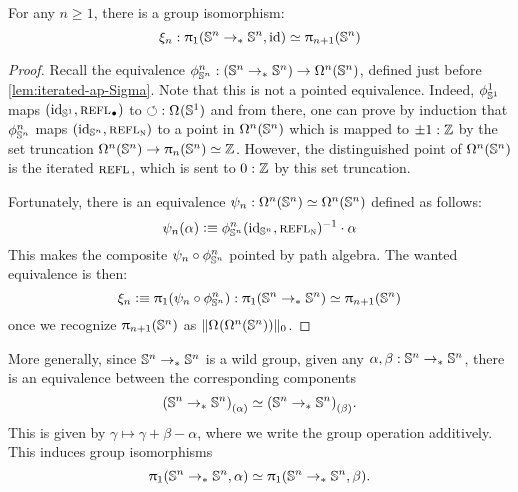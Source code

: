 \documentclass[english,a4paper]{lmcs}
\begin{document}
\begin{lem}
  For any $n\geq 1$, there is a group isomorphism:
  \begin{displaymath}
    \xi_n: \uppi_{1}({\mathbb S^{n}} \to_\ast {\mathbb S^{n}}, \mathord{\mathrm{id}}) \simeq \uppi_{n+1} ({\mathbb S^{n}})
  \end{displaymath}
  \label{lem:fgr-ptd-endomaps-Sn}
\end{lem}
\begin{proof}
  Recall the equivalence $\phi_{{\mathbb S^{n}}}^n : ({\mathbb S^{n}} \to_\ast {\mathbb S^{n}}) \to \mathop{\Omega^{n}} ({\mathbb S^{n}})$, defined just before \cref{lem:iterated-ap-Sigma}. Note that
  this is not a pointed equivalence. Indeed, $\phi_{{{\mathbb S^{1}}}}^1$ maps $(\id_\Sc,
  \refl\base)$ to $\Sloop: \loopspace\null(\Sc)$ and from there, one can prove by
  induction that $\phi_{{\mathbb S^{n}}}^n$ maps $(\mathord{\mathrm{id}}_{{\mathbb S^{n}}}, \mathop{{\textsc{refl}}_{\textsc{n}}})$ to a point in
  $\mathop{\Omega^{n}} ({\mathbb S^{n}})$ which is mapped to $\pm 1:\mathbb{Z}$ by the set truncation
  $\mathop{\Omega^{n}} ({\mathbb S^{n}}) \to \uppi_{n} ({\mathbb S^{n}}) \simeq \mathbb{Z}$. However, the distinguished
  point of $\mathop{\Omega^{n}} ({\mathbb S^{n}})$ is the iterated $\mathop{{\textsc{refl}}_{}}$, which is sent to
  $0:\mathbb{Z}$ by this set truncation.

  Fortunately, there is an equivalence $\psi_n:\mathop{\Omega^{n}} ({\mathbb S^{n}}) \simeq
  \mathop{\Omega^{n}}({\mathbb S^{n}})$ defined as follows:
  \begin{equation}
    \psi_n (\alpha) \vcentcolon\equiv \phi_{{\mathbb S^{n}}}^n(\mathord{\mathrm{id}}_{{\mathbb S^{n}}},\mathop{{\textsc{refl}}_{\textsc{n}}})^{-1}\cdot \alpha
    \label{eq:self-eq-to-refl}
  \end{equation}
  This makes the composite $\psi_n \circ \phi_{{\mathbb S^{n}}}^n$ pointed by path algebra.
  The wanted equivalence is then:
  \begin{equation}
    \xi_n\vcentcolon\equiv \uppi_{1}(\psi_n \circ \phi_{{\mathbb S^{n}}}^n) :
    \uppi_{1}({\mathbb S^{n}} \to_\ast {\mathbb S^{n}}) \simeq \uppi_{n+1} ({\mathbb S^{n}})
    \label{eq:fgr-ptd-endomaps-Sn-defn}
  \end{equation}
  once we recognize $\uppi_{n+1}({\mathbb S^{n}})$ as $\lVert\mathop{\Omega^{}}(\mathop{\Omega^{n}} ({\mathbb S^{n}}))\rVert_0$.
\end{proof}

\begin{rem}
  More generally, since ${\mathbb S^{n}} \to_\ast {\mathbb S^{n}}$ is a wild group,
  given any $\alpha,\beta : {\mathbb S^{n}} \to_\ast {\mathbb S^{n}}$,
  there is an equivalence between the corresponding components
  \[
    {({\mathbb S^{n}} \to_\ast {\mathbb S^{n}})}_{\left(\alpha\right)} \simeq
    {({\mathbb S^{n}} \to_\ast{\mathbb S^{n}})}_{\left(\beta\right)}.
  \]
  This is given by $\gamma \mapsto \gamma + \beta - \alpha$,
  where we write the group operation additively.
  This induces group isomorphisms
  \[
    \uppi_{1}({\mathbb S^{n}} \to_\ast {\mathbb S^{n}}, \alpha) \simeq
    \uppi_{1}({\mathbb S^{n}} \to_\ast {\mathbb S^{n}}, \beta).
  \]
\end{rem}
\end{document}
